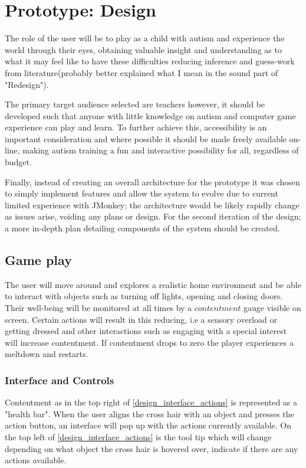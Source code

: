 \documentclass[11pt]{report}
\begin{document}
\chapter{Prototype: Design}
The role of the user will be to play as a child with autism and experience the world through their eyes, obtaining valuable insight and understanding as to what it may feel like to have these difficulties reducing inference and guess-work from literature(probably better explained what I mean in the sound part of "Redesign").

The primary target audience selected are teachers however, it should be developed such that anyone with little knowledge on autism and computer game experience can play and learn. To further achieve this, accessibility is an important consideration and where possible it should be made freely available on-line, making autism training a fun and interactive possibility for all, regardless of budget.  

Finally, instead of creating an overall architecture for the prototype it was chosen to simply implement features and allow the system to evolve due to current limited experience with JMonkey; the architecture would be likely rapidly change as issues arise, voiding any plans or design. For the second iteration of the design; a more in-depth plan detailing components of the system should be created.

\section{Game play}

The user will move around and explores a realistic home environment and be able to interact with objects such as turning off lights, opening and closing doors. Their well-being will be monitored at all times by a $contentment$ gauge visible on screen. Certain actions will result in this reducing, i.e a sensory overload or getting dressed and other interactions such as engaging with a special interest will increase contentment. If contentment drops to zero the player experiences a meltdown and restarts. 

\subsection{Interface and Controls}

Contentment as in the top right of \ref{design_interface_actions} is represented as a "health bar". When the user aligns the cross hair with an object and presses the action button, an interface will pop up with the actions currently available. On the top left of \ref{design_interface_actions} is the tool tip which will change depending on what object the cross hair is hovered over, indicate if there are any actions available. 
\end{document}
